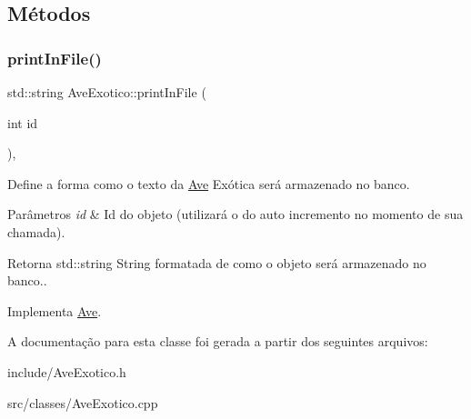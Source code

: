 \subsection{Métodos}
\mbox{\label{classAveExotico_a4ba81def12131f047b3800e5f10a983b}} 
\subsubsection{\texorpdfstring{print\+In\+File()}{printInFile()}}
{\footnotesize\ttfamily std\+::string Ave\+Exotico\+::print\+In\+File (\begin{DoxyParamCaption}\item[{int}]{id }\end{DoxyParamCaption})\hspace{0.3cm}{\ttfamily [protected]}, {\ttfamily [virtual]}}



Define a forma como o texto da \hyperlink{classAve}{Ave} Exótica será armazenado no banco. 


\begin{DoxyParams}{Parâmetros}
{\em id} & Id do objeto (utilizará o do auto incremento no momento de sua chamada). \\
\hline
\end{DoxyParams}
\begin{DoxyReturn}{Retorna}
std\+::string String formatada de como o objeto será armazenado no banco.. 
\end{DoxyReturn}


Implementa \hyperlink{classAve_ab858405e18c56876e331ad943885ee53}{Ave}.



A documentação para esta classe foi gerada a partir dos seguintes arquivos\+:\begin{DoxyCompactItemize}
\item 
include/Ave\+Exotico.\+h\item 
src/classes/Ave\+Exotico.\+cpp\end{DoxyCompactItemize}
